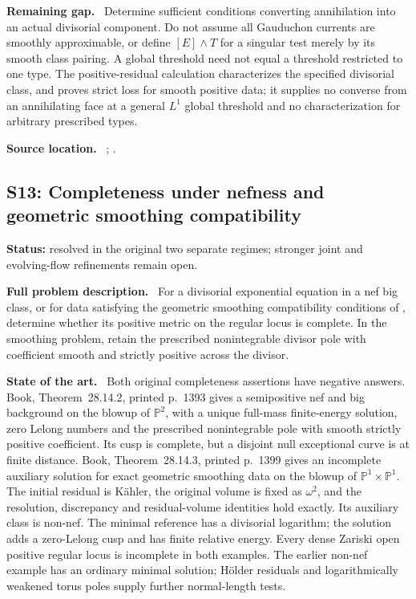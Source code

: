 \documentclass[11pt]{article}
\newcommand{\field}[1]{\par\medskip\noindent\textbf{#1.}\ }
\begin{document}
\field{Remaining gap} Determine sufficient conditions converting annihilation into an actual divisorial component. Do not assume all Gauduchon currents are smoothly approximable, or define $[E]\wedge T$ for a singular test merely by its smooth class pairing. A global threshold need not equal a threshold restricted to one type. The positive-residual calculation characterizes the specified divisorial class, and proves strict loss for smooth positive data; it supplies no converse from an annihilating face at a general $L^1$ global threshold and no characterization for arbitrary prescribed types.
\field{Source location} ; .
\subsection{S13: Completeness under nefness and geometric smoothing compatibility}
\label{S13}
\noindent\textbf{Status:} resolved in the original two separate regimes; stronger joint and evolving-flow refinements remain open.
\field{Full problem description} For a divisorial exponential equation in a nef big class, or for data satisfying the geometric smoothing compatibility conditions of \cite[Section 3.1]{DNGL26}, determine whether its positive metric on the regular locus is complete. In the smoothing problem, retain the prescribed nonintegrable divisor pole with coefficient smooth and strictly positive across the divisor.
\field{State of the art} Both original completeness assertions have negative answers. Book, Theorem~28.14.2, printed p.~1393 gives a semipositive nef and big background on the blowup of $\mathbb P^2$, with a unique full-mass finite-energy solution, zero Lelong numbers and the prescribed nonintegrable pole with smooth strictly positive coefficient. Its cusp is complete, but a disjoint null exceptional curve is at finite distance. Book, Theorem~28.14.3, printed p.~1399 gives an incomplete auxiliary solution for exact geometric smoothing data on the blowup of $\mathbb P^1\times\mathbb P^1$. The initial residual is K\"ahler, the original volume is fixed as $\omega^2$, and the resolution, discrepancy and residual-volume identities hold exactly. Its auxiliary class is non-nef. The minimal reference has a divisorial logarithm; the solution adds a zero-Lelong cusp and has finite relative energy. Every dense Zariski open positive regular locus is incomplete in both examples. The earlier non-nef example has an ordinary minimal solution; H\"older residuals and logarithmically weakened torus poles supply further normal-length tests.
\end{document}
